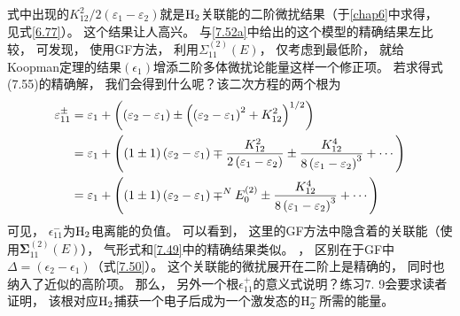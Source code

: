 式中出现的${K_{12}^{2}}/{2\left(\varepsilon_{1}-\varepsilon_{2}\right)}$就是$\mathrm{H}_2$关联能的二阶微扰结果（于\ref{chap6}中求得，
见式\eqref{6.77}）。
这个结果让人高兴。
与\eqref{7.52a}中给出的这个模型的精确结果左比较，
可发现，
使用GF方法，
利用$\Sigma_{11}^{(2)}(E)$，
仅考虑到最低阶，
就给Koopman定理的结果$(\epsilon_1)$增添二阶多体微扰论能量这样一个修正项。
若求得式(7.55)的精确解，
我们会得到什么呢？该二次方程的两个根为
\begin{align}
\varepsilon_{11}^{\pm} &=\varepsilon_{1}+\left(\left(\varepsilon_{2}-\varepsilon_{1}\right) \pm\left(\left(\varepsilon_{2}-\varepsilon_{1}\right)^{2}+K_{12}^{2}\right)^{1 / 2}\right) \notag\\
&=\varepsilon_{1}+\left((1 \pm 1)\left(\varepsilon_{2}-\varepsilon_{1}\right) \mp \frac{K_{12}^{2}}{2\left(\varepsilon_{1}-\varepsilon_{2}\right)} \pm \frac{K_{12}^{4}}{8\left(\varepsilon_{1}-\varepsilon_{2}\right)^{3}}+\cdots\right) \notag\\
	&=\varepsilon_{1}+\left((1 \pm 1)\left(\varepsilon_{2}-\varepsilon_{1}\right) \mp^{N} E_{0}^{(2)} \pm \frac{K_{12}^{4}}{8\left(\varepsilon_{1}-\varepsilon_{2}\right)^{3}}+\cdots\right) \label{7.57}
\end{align}
可见，
$\epsilon_{11}^-$为$\mathrm{H}_2$电离能的负值。
可以看到，
这里的GF方法中隐含着的关联能（使用$\mathbf{\Sigma}_{11}^{(2)}(E)$），
气形式和\eqref{7.49}中的精确结果类似。
，
区别在于GF中$\Delta=(\epsilon_{2}-\epsilon_1)$（式\eqref{7.50}）。
这个关联能的微扰展开在二阶上是精确的，
同时也纳入了近似的高阶项。
那么，
另外一个根$\epsilon_{11}^+$的意义式说明？练习7.
9会要求读者证明，
该根对应$\mathrm{H}_2$捕获一个电子后成为一个激发态的$\mathrm{H}_2^-$所需的能量。

